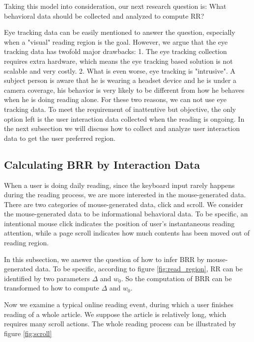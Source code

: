\documentclass{sigchi}
\begin{document}
Taking this model into consideration, our next  research question is: 
What behavioral data should be collected and analyzed to compute RR?

Eye tracking data can be easily mentioned to answer the question, especially when a "visual" reading region is 
the goal. However, we argue that the eye tracking data has twofold major drawbacks: 1. The eye tracking collection 
requires extra hardware, which means the eye tracking  based solution  is not scalable and very costly. 2. What is even worse, 
eye tracking is "intrusive". A subject person is aware that he is wearing a headset device and he is under a camera coverage, 
his behavior is very likely to be different from how he behaves when he is doing reading alone. For these two reasons, we 
can not use eye tracking data. To meet the requirement of inattentive but objective, the only option left is the user interaction data 
collected when the reading is ongoing.  In the next subsection we will discuss how to collect and analyze user
 interaction data to get the user preferred region. 


\subsection{Calculating BRR by Interaction Data}

When a user is doing daily reading, since the keyboard input rarely happens 
during the reading process,  we are more interested in the mouse-generated data. 
There are two categories of mouse-generated data, click and scroll.  We consider the mouse-generated data to be 
informational  behavioral data. To be specific, an intentional  mouse click indicates 
the position of user's instantaneous reading attention, 
while a page scroll indicates how much contents has been moved out of reading region.

In this subsection, we answer the question of how to infer BRR by mouse-generated data. To be specific, 
according to figure \ref{fig:read_region},  RR can be identified by two parameters $\Delta$ and $w_0$. So
the computation of BRR can be transformed to how to compute  $\Delta$ and $w_0$.


Now we examine a typical online reading event, during which a user finishes reading of a whole article. We suppose 
the article is relatively long, which requires many scroll actions. 
The whole reading process can be illustrated by figure \ref{fig:scroll}
\end{document}
